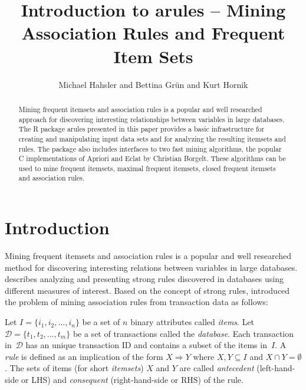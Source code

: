 \documentclass[10pt,a4paper]{article}
\newcommand{\strong}[1]{{\normalfont\fontseries{b}\selectfont #1}}
\newcommand{\pkg}[1]{\strong{#1}}
\newcommand{\proglang}[1]{\textsf{#1}}
\newcommand{\set}[1]{\mathcal{#1}}
\begin{document}
\title{Introduction to \pkg{arules} -- Mining 
    Association Rules and Frequent Item Sets}
\author{Michael Hahsler and Bettina Gr{\"u}n and Kurt Hornik}
\maketitle
\sloppy
\begin{abstract}
  Mining frequent itemsets and association rules is a popular and well
  researched approach for discovering interesting relationships between
  variables in large databases.  The \proglang{R} package \pkg{arules}
  presented in this paper provides a basic infrastructure for creating
  and manipulating input data sets and for analyzing the resulting
  itemsets and rules.  The package also includes interfaces to two fast
  mining algorithms, the popular \proglang{C} implementations of Apriori
  and Eclat by Christian Borgelt.  These algorithms can be used to mine
  frequent itemsets, maximal frequent itemsets, closed frequent itemsets
  and association rules.
\end{abstract}


\section{Introduction}

Mining frequent itemsets and association rules is a popular and well
researched method for discovering interesting relations between
variables in large databases. \cite{arules:Piatetsky-Shapiro:1991}
describes analyzing and presenting strong rules discovered in databases
using different measures of interest.  Based on the concept of strong
rules, \cite{arules:Agrawal+Imielinski+Swami:1993} introduced the
problem of mining association rules from transaction data as follows:

Let $I=\{i_1, i_2,\ldots,i_n\}$ be a set of $n$ binary attributes called
\emph{items}.  Let $\set{D} = \{t_1, t_2, \ldots, t_m\}$ be a set of
transactions called the \emph{database}.  Each transaction
in~$\set{D}$ has an unique transaction ID and
contains a subset of the items in~$I$.
A \emph{rule} is defined as an implication of the form $X \Rightarrow Y$
where $X, Y \subseteq I$ and $X \cap Y = \emptyset$.  The sets of items
(for short \emph{itemsets}) $X$ and $Y$ are called \emph{antecedent}
(left-hand-side or LHS) and \emph{consequent} (right-hand-side or RHS)
of the rule.
\end{document}
